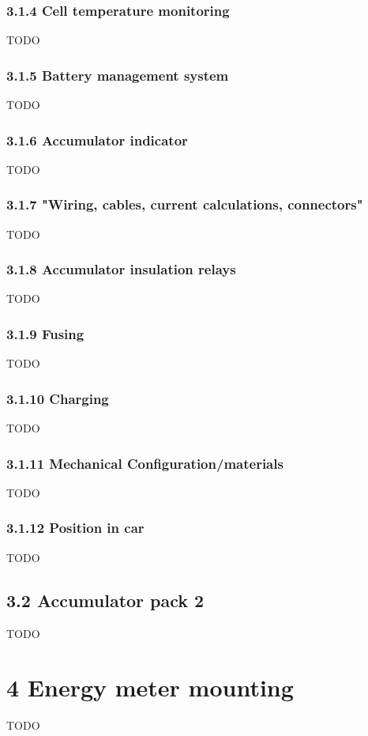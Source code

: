 \documentclass{article}
\begin{document}
\subsubsection*{3.1.4 Cell temperature monitoring}
TODO

\subsubsection*{3.1.5 Battery management system}
TODO

\subsubsection*{3.1.6 Accumulator indicator}
TODO

\subsubsection*{3.1.7 "Wiring, cables, current calculations, connectors"}
TODO

\subsubsection*{3.1.8 Accumulator insulation relays}
TODO

\subsubsection*{3.1.9 Fusing}
TODO

\subsubsection*{3.1.10 Charging}
TODO

\subsubsection*{3.1.11 Mechanical Configuration/materials}
TODO

\subsubsection*{3.1.12 Position in car}
TODO

\subsection*{3.2 Accumulator pack 2}
TODO

\section*{4 Energy meter mounting}
TODO
\end{document}
